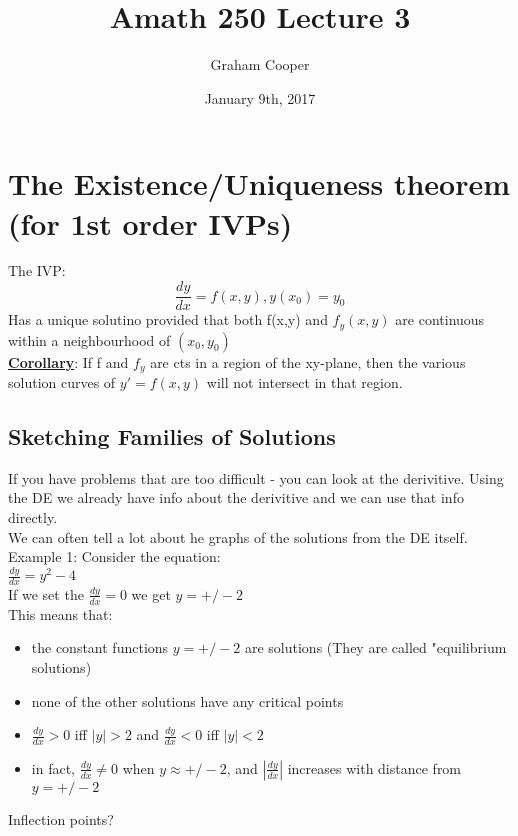 \documentclass[12pt]{article}
\title{\vspace{-15ex}Amath 250 Lecture 3\vspace{-1ex}}
\date{January 9th, 2017}
\author{Graham Cooper}
\newcommand{\myt}[1]{\textbf{\underline{#1}}}
\begin{document}
	\maketitle
	
	\section*{The Existence/Uniqueness theorem (for 1st order IVPs)}
	The IVP:
	$$\frac{dy}{dx} = f(x,y), y(x_0) = y_0$$
	Has a unique solutino provided that both f(x,y) and $f_y(x,y)$ are continuous within a neighbourhood of $(x_0, y_0)$\\
	
	\myt{Corollary}: If f and $f_y$ are cts in a region of the xy-plane, then the various solution curves of $y'=f(x,y)$ will not intersect in that region.\\
	
	\subsection*{Sketching Families of Solutions}
	
	If you have problems that are too difficult - you can look at the derivitive. Using the DE we already have info about the derivitive and we can use that info directly.\\
	
	We can often tell a lot about he graphs of the solutions from the DE itself.\\
	
	Example 1: Consider the equation:\\
	$\frac{dy}{dx} = y^2 - 4$\\
	
	If we set the $\frac{dy}{dx} = 0$ we get $y = +/- 2$\\
	This means that:
	\begin{itemize}
		\item the constant functions $y = +/-2$ are solutions (They are called "equilibrium solutions)
		\item none of the other solutions have any critical points
		\item $\frac{dy}{dx} > 0$ iff $|y| > 2$ and $\frac{dy}{dx} < 0$ iff $|y| < 2$
		\item in fact, $\frac{dy}{dx} \ne 0$ when $y \approx +/-2$, and $|\frac{dy}{dx}|$ increases with distance from $y = +/-2$
	\end{itemize}

	Inflection points?
	
\end{document}
